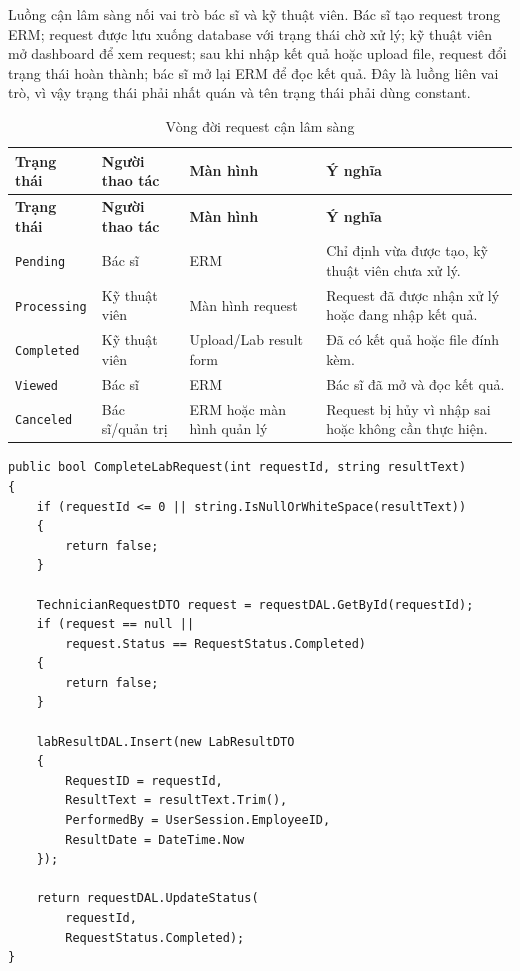 \documentclass[12pt,a4paper]{article}
\numberwithin{figure}{subsection}
\numberwithin{table}{subsection}
\newcounter{codecounter}
\newenvironment{codeblock}[2]{%
    \refstepcounter{codecounter}%
    \phantomsection%
    \label{#1}%
    \par\smallskip
}{%
    \par\smallskip
}
\begin{document}
Luồng cận lâm sàng nối vai trò bác sĩ và kỹ thuật viên. Bác sĩ tạo request trong ERM; request được lưu xuống database với trạng thái chờ xử lý; kỹ thuật viên mở dashboard để xem request; sau khi nhập kết quả hoặc upload file, request đổi trạng thái hoàn thành; bác sĩ mở lại ERM để đọc kết quả. Đây là luồng liên vai trò, vì vậy trạng thái phải nhất quán và tên trạng thái phải dùng constant.

\begin{longtable}{|p{2.6cm}|p{3.6cm}|p{3.8cm}|p{4.2cm}|}
\caption{Vòng đời request cận lâm sàng} \\
\hline
\textbf{Trạng thái} & \textbf{Người thao tác} & \textbf{Màn hình} & \textbf{Ý nghĩa} \\
\hline
\endfirsthead
\hline
\textbf{Trạng thái} & \textbf{Người thao tác} & \textbf{Màn hình} & \textbf{Ý nghĩa} \\
\hline
\endhead
\texttt{Pending} & Bác sĩ & ERM & Chỉ định vừa được tạo, kỹ thuật viên chưa xử lý. \\
\hline
\texttt{Processing} & Kỹ thuật viên & Màn hình request & Request đã được nhận xử lý hoặc đang nhập kết quả. \\
\hline
\texttt{Completed} & Kỹ thuật viên & Upload/Lab result form & Đã có kết quả hoặc file đính kèm. \\
\hline
\texttt{Viewed} & Bác sĩ & ERM & Bác sĩ đã mở và đọc kết quả. \\
\hline
\texttt{Canceled} & Bác sĩ/quản trị & ERM hoặc màn hình quản lý & Request bị hủy vì nhập sai hoặc không cần thực hiện. \\
\hline
\end{longtable}

\begin{codeblock}{code:technician-complete-request}{Cập nhật request sau khi có kết quả}
\begin{verbatim}
public bool CompleteLabRequest(int requestId, string resultText)
{
    if (requestId <= 0 || string.IsNullOrWhiteSpace(resultText))
    {
        return false;
    }

    TechnicianRequestDTO request = requestDAL.GetById(requestId);
    if (request == null ||
        request.Status == RequestStatus.Completed)
    {
        return false;
    }

    labResultDAL.Insert(new LabResultDTO
    {
        RequestID = requestId,
        ResultText = resultText.Trim(),
        PerformedBy = UserSession.EmployeeID,
        ResultDate = DateTime.Now
    });

    return requestDAL.UpdateStatus(
        requestId,
        RequestStatus.Completed);
}
\end{verbatim}
\end{codeblock}
\end{document}
